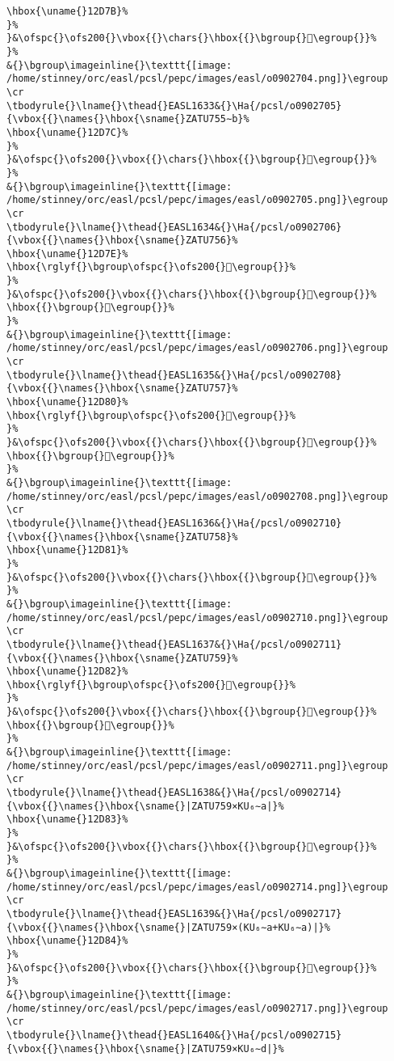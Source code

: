 \begin{verbatim}
\hbox{\uname{}12D7B}%
}%
}&\ofspc{}\ofs200{}\vbox{{}\chars{}\hbox{{}\bgroup{}𒵻\egroup{}}%
}%
&{}\bgroup\imageinline{}\texttt{[image: /home/stinney/orc/easl/pcsl/pepc/images/easl/o0902704.png]}\egroup
\cr
\tbodyrule{}\lname{}\thead{}EASL1633&{}\Ha{/pcsl/o0902705}{\vbox{{}\names{}\hbox{\sname{}ZATU755∼b}%
\hbox{\uname{}12D7C}%
}%
}&\ofspc{}\ofs200{}\vbox{{}\chars{}\hbox{{}\bgroup{}𒵼\egroup{}}%
}%
&{}\bgroup\imageinline{}\texttt{[image: /home/stinney/orc/easl/pcsl/pepc/images/easl/o0902705.png]}\egroup
\cr
\tbodyrule{}\lname{}\thead{}EASL1634&{}\Ha{/pcsl/o0902706}{\vbox{{}\names{}\hbox{\sname{}ZATU756}%
\hbox{\uname{}12D7E}%
\hbox{\rglyf{}\bgroup\ofspc{}\ofs200{}𒵾\egroup{}}%
}%
}&\ofspc{}\ofs200{}\vbox{{}\chars{}\hbox{{}\bgroup{}𒵽\egroup{}}%
\hbox{{}\bgroup{}𒵾\egroup{}}%
}%
&{}\bgroup\imageinline{}\texttt{[image: /home/stinney/orc/easl/pcsl/pepc/images/easl/o0902706.png]}\egroup
\cr
\tbodyrule{}\lname{}\thead{}EASL1635&{}\Ha{/pcsl/o0902708}{\vbox{{}\names{}\hbox{\sname{}ZATU757}%
\hbox{\uname{}12D80}%
\hbox{\rglyf{}\bgroup\ofspc{}\ofs200{}𒶀\egroup{}}%
}%
}&\ofspc{}\ofs200{}\vbox{{}\chars{}\hbox{{}\bgroup{}𒵿\egroup{}}%
\hbox{{}\bgroup{}𒶀\egroup{}}%
}%
&{}\bgroup\imageinline{}\texttt{[image: /home/stinney/orc/easl/pcsl/pepc/images/easl/o0902708.png]}\egroup
\cr
\tbodyrule{}\lname{}\thead{}EASL1636&{}\Ha{/pcsl/o0902710}{\vbox{{}\names{}\hbox{\sname{}ZATU758}%
\hbox{\uname{}12D81}%
}%
}&\ofspc{}\ofs200{}\vbox{{}\chars{}\hbox{{}\bgroup{}𒶁\egroup{}}%
}%
&{}\bgroup\imageinline{}\texttt{[image: /home/stinney/orc/easl/pcsl/pepc/images/easl/o0902710.png]}\egroup
\cr
\tbodyrule{}\lname{}\thead{}EASL1637&{}\Ha{/pcsl/o0902711}{\vbox{{}\names{}\hbox{\sname{}ZATU759}%
\hbox{\uname{}12D82}%
\hbox{\rglyf{}\bgroup\ofspc{}\ofs200{}𒶂\egroup{}}%
}%
}&\ofspc{}\ofs200{}\vbox{{}\chars{}\hbox{{}\bgroup{}𒶈\egroup{}}%
\hbox{{}\bgroup{}𒶂\egroup{}}%
}%
&{}\bgroup\imageinline{}\texttt{[image: /home/stinney/orc/easl/pcsl/pepc/images/easl/o0902711.png]}\egroup
\cr
\tbodyrule{}\lname{}\thead{}EASL1638&{}\Ha{/pcsl/o0902714}{\vbox{{}\names{}\hbox{\sname{}|ZATU759×KU₆∼a|}%
\hbox{\uname{}12D83}%
}%
}&\ofspc{}\ofs200{}\vbox{{}\chars{}\hbox{{}\bgroup{}𒶃\egroup{}}%
}%
&{}\bgroup\imageinline{}\texttt{[image: /home/stinney/orc/easl/pcsl/pepc/images/easl/o0902714.png]}\egroup
\cr
\tbodyrule{}\lname{}\thead{}EASL1639&{}\Ha{/pcsl/o0902717}{\vbox{{}\names{}\hbox{\sname{}|ZATU759×(KU₆∼a+KU₆∼a)|}%
\hbox{\uname{}12D84}%
}%
}&\ofspc{}\ofs200{}\vbox{{}\chars{}\hbox{{}\bgroup{}𒶄\egroup{}}%
}%
&{}\bgroup\imageinline{}\texttt{[image: /home/stinney/orc/easl/pcsl/pepc/images/easl/o0902717.png]}\egroup
\cr
\tbodyrule{}\lname{}\thead{}EASL1640&{}\Ha{/pcsl/o0902715}{\vbox{{}\names{}\hbox{\sname{}|ZATU759×KU₆∼d|}%

\end{verbatim}

